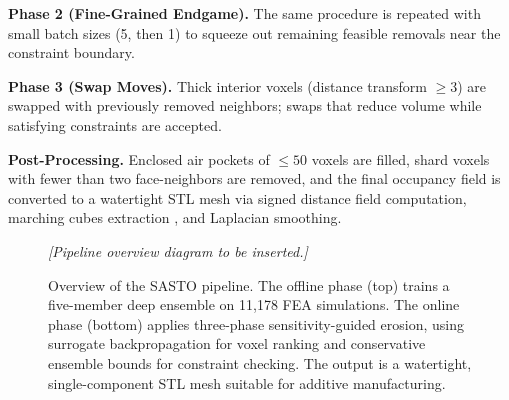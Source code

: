 \documentclass[11pt]{article}
\theoremstyle{plain}
\theoremstyle{definition}
\theoremstyle{remark}
\begin{document}
\textbf{Phase 2 (Fine-Grained Endgame).} The same procedure is repeated with small batch sizes (5, then 1) to squeeze out remaining feasible removals near the constraint boundary.

\textbf{Phase 3 (Swap Moves).} Thick interior voxels (distance transform $\geq 3$) are swapped with previously removed neighbors; swaps that reduce volume while satisfying constraints are accepted.

\textbf{Post-Processing.} Enclosed air pockets of $\leq 50$ voxels are filled, shard voxels with fewer than two face-neighbors are removed, and the final occupancy field is converted to a watertight STL mesh via signed distance field computation, marching cubes extraction \cite{lorensen1987}, and Laplacian smoothing.

\begin{figure}[t]
\centering
\textit{[Pipeline overview diagram to be inserted.]}
\caption{Overview of the SASTO pipeline. The offline phase (top) trains a five-member deep ensemble on 11,178 FEA simulations. The online phase (bottom) applies three-phase sensitivity-guided erosion, using surrogate backpropagation for voxel ranking and conservative ensemble bounds for constraint checking. The output is a watertight, single-component STL mesh suitable for additive manufacturing.}
\label{fig:pipeline}
\end{figure}
\end{document}
